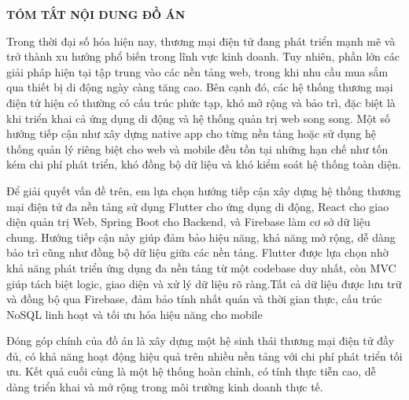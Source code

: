 \documentclass[../DoAn.tex]{subfiles}
\begin{document}
\begin{center}
    \Large{\textbf{TÓM TẮT NỘI DUNG ĐỒ ÁN}}\\
\end{center}
\vspace{1cm}
Trong thời đại số hóa hiện nay, thương mại điện tử đang phát triển mạnh mẽ và trở thành xu hướng phổ biến trong lĩnh vực kinh doanh. Tuy nhiên, phần lớn các giải pháp hiện tại tập trung vào các nền tảng web, trong khi nhu cầu mua sắm qua thiết bị di động ngày càng tăng cao. Bên cạnh đó, các hệ thống thương mại điện tử hiện có thường có cấu trúc phức tạp, khó mở rộng và bảo trì, đặc biệt là khi triển khai cả ứng dụng di động và hệ thống quản trị web song song. Một số hướng tiếp cận như xây dựng native app cho từng nền tảng hoặc sử dụng hệ thống quản lý riêng biệt cho web và mobile đều tồn tại những hạn chế như tốn kém chi phí phát triển, khó đồng bộ dữ liệu và khó kiểm soát hệ thống toàn diện.

Để giải quyết vấn đề trên, em lựa chọn hướng tiếp cận xây dựng hệ thống thương mại điện tử đa nền tảng sử dụng Flutter cho ứng dụng di động, React cho giao diện quản trị Web, Spring Boot cho Backend, và Firebase làm cơ sở dữ liệu chung. Hướng tiếp cận này giúp đảm bảo hiệu năng, khả năng mở rộng, dễ dàng bảo trì cũng như đồng bộ dữ liệu giữa các nền tảng. Flutter được lựa chọn nhờ khả năng phát triển ứng dụng đa nền tảng từ một codebase duy nhất, còn MVC giúp tách biệt logic, giao diện và xử lý dữ liệu rõ ràng.Tất cả dữ liệu được lưu trữ và đồng bộ qua Firebase, đảm bảo tính nhất quán và thời gian thực, cấu trúc NoSQL linh hoạt và tối ưu hóa hiệu năng cho mobile

Đóng góp chính của đồ án là xây dựng một hệ sinh thái thương mại điện tử đầy đủ, có khả năng hoạt động hiệu quả trên nhiều nền tảng với chi phí phát triển tối ưu. Kết quả cuối cùng là một hệ thống hoàn chỉnh, có tính thực tiễn cao, dễ dàng triển khai và mở rộng trong môi trường kinh doanh thực tế.
\end{document}
